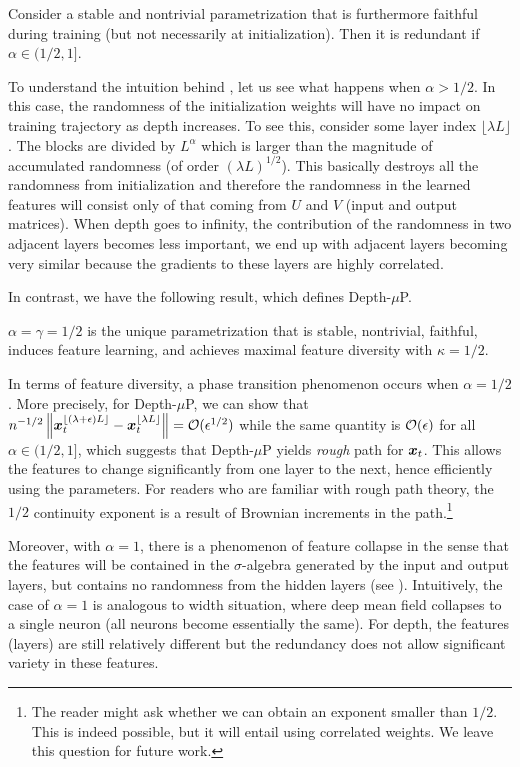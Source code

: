 \documentclass{article}
\theoremstyle{plain}
\theoremstyle{definition}
\begin{document}
\begin{claim}\label{clm:redundant}
    Consider a stable and nontrivial parametrization that is furthermore faithful during training (but not necessarily at initialization).
    Then it is redundant if $\alpha \in (1/2, 1]$.
\end{claim}
To understand the intuition behind , let us see what happens when $\alpha > 1/2$. In this case, the randomness of the initialization weights will have no impact on training trajectory as depth increases. To see this, consider some layer index $\lfloor \lambda L\rfloor$. The blocks are divided by $L^{\alpha}$ which is larger than the magnitude of accumulated randomness (of order $(\lambda L)^{1/2}$). This basically destroys all the randomness from initialization and therefore the randomness in the learned features will consist only of that coming from $U$ and $V$ (input and output matrices). When depth goes to infinity, the contribution of the randomness in two adjacent layers becomes less important, we end up with adjacent layers becoming very similar because the gradients to these layers are highly correlated. 

In contrast, we have the following result, which defines Depth-$\mu$P.

\begin{claim}[Depth-$\mu$P]\label{clm:depth_mup}
    $\alpha = \gamma = 1/2$ is the unique parametrization that is stable, nontrivial, faithful, induces feature learning, and achieves maximal feature diversity with $\kappa =1/2$.
\end{claim}

In terms of feature diversity, a phase transition phenomenon occurs when $\alpha = 1/2$. More precisely, for Depth-$\mu$P, we can show that $n^{-1/2} \left\| {\boldsymbol{x}^{\lfloor (\lambda + \epsilon) L \rfloor}_t - \boldsymbol{x}_t^{\lfloor \lambda L \rfloor}} \right\| = \mathcal{O}(\epsilon^{1/2})$ while the same quantity is $\mathcal{O}(\epsilon)$ for all $\alpha \in (1/2,1]$, which suggests that Depth-$\mu$P yields \emph{rough} path for $\boldsymbol{x}_t$. This allows the features to change significantly from one layer to the next, hence efficiently using the parameters. For readers who are familiar with rough path theory, the $1/2$ continuity exponent is a result of Brownian increments in the path.\footnote{The reader might ask whether we can obtain an exponent smaller than $1/2$. This is indeed possible, but it will entail using correlated weights. We leave this question for future work.}

Moreover, with $\alpha = 1$, there is a phenomenon of feature collapse in the sense that the features will be contained in the $\sigma$-algebra generated by the input and output layers, but contains no randomness from the hidden layers (see ). Intuitively, the case of $\alpha=1$ is analogous to width situation, where deep mean field collapses to a
single neuron (all neurons become essentially the same). For depth, the features (layers) are still relatively different but the redundancy does not allow significant variety in these features.
\end{document}

